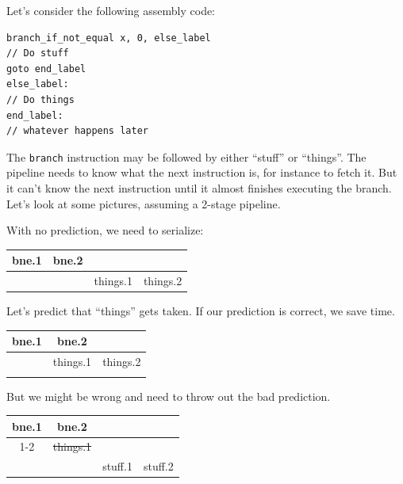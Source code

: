 Let's consider the following assembly code:

\hspace*{2em} \begin{minipage}{.4\textwidth} \begin{lstlisting}
branch_if_not_equal x, 0, else_label
// Do stuff
goto end_label
else_label:
// Do things
end_label:
// whatever happens later
\end{lstlisting}
\end{minipage}

The {\tt branch} instruction may be followed by either ``stuff'' or ``things''.
The pipeline needs to know what the next instruction is, for instance to fetch it.
But it can't know the next instruction until it almost finishes executing the branch.
Let's look at some pictures, assuming a 2-stage pipeline.

With no prediction, we need to serialize:

\begin{center}
\begin{tabular}{c|c|c|c}
bne.1 & bne.2 \\ \hline
& & things.1 & things.2
\end{tabular}
\end{center}

\begin{minipage}{.49\textwidth}
Let's predict that ``things'' gets taken.
If our prediction is correct, we save time.

\begin{center}
\begin{tabular}{c|c|c}
bne.1 & bne.2 \\ \hline
& things.1 & things.2 \\
\\
\end{tabular}
\end{center}
\end{minipage} \hspace*{.02\textwidth} \begin{minipage}{.49\textwidth}
But we might be wrong and need to throw out the bad prediction.

\begin{center}
\begin{tabular}{c|c|c|c}
bne.1 & bne.2 \\ \cline{1-2}
& \sout{things.1} \\ \hline
& & stuff.1 & stuff.2
\end{tabular}
\end{center}
\end{minipage}

